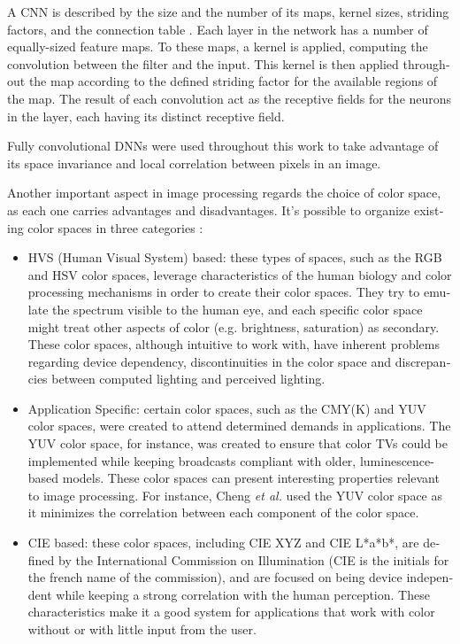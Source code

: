\documentclass[12pt,openright,twoside,a4paper,english]{abntex2}
\begin{document}
\begin{otherlanguage}{english}
A CNN is described by the size and the number of its maps, kernel sizes, striding factors, and the connection table \cite{Ciresan2011}. Each layer in the network has a number of equally-sized feature maps. To these maps, a kernel is applied, computing the convolution between the filter and the input. This kernel is then applied throughout the map according to the defined striding factor for the available regions of the map. The result of each convolution act as the receptive fields for the neurons in the layer, each having its distinct receptive field.

Fully convolutional DNNs were used throughout this work to take advantage of its space invariance and local correlation between pixels in an image.

Another important aspect in image processing regards the choice of color space, as each one carries advantages and disadvantages. It's possible to organize existing color spaces in three categories \cite{colorspace}:
\begin{itemize}
    \item HVS (Human Visual System) based: these types of spaces, such as the RGB and HSV color spaces, leverage characteristics of the human biology and color processing mechanisms in order to create their color spaces. They  try to emulate the spectrum visible to the human eye, and each specific color space might treat other aspects of color (e.g. brightness, saturation) as secondary. These color spaces, although intuitive to work with, have inherent problems regarding device dependency, discontinuities in the color space and discrepancies between computed lighting and perceived lighting.
    \item Application Specific: certain color spaces, such as the CMY(K) and YUV color spaces, were created to attend determined demands in applications. The YUV color space, for instance, was created to ensure that color TVs could be implemented while keeping broadcasts compliant with older, luminescence-based models. These color spaces can present interesting properties relevant to image processing. For instance, Cheng \textit{et al.} \cite{Cheng2015} used the YUV color space as it minimizes the correlation between each component of the color space.
    \item  CIE based: these color spaces, including CIE XYZ and CIE L*a*b*, are defined by the International Commission on Illumination (CIE is the initials for the french name of the commission),  and are focused on being device independent while keeping a strong correlation with the human perception. These characteristics make it a good system for applications that work with color without or with little input from the user.
\end{itemize}


\end{otherlanguage}
\end{document}
